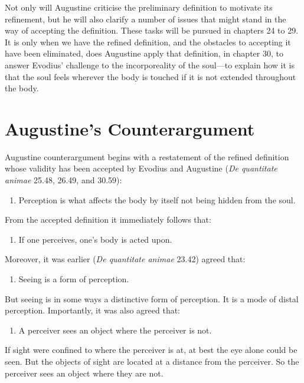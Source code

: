 \documentclass[12pt]{article}
\begin{document}
Not only will Augustine criticise the preliminary definition to motivate its refinement, but he will also clarify a number of issues that might stand in the way of accepting the definition. These tasks will be pursued in chapters 24 to 29. It is only when we have the refined definition, and the obstacles to accepting it have been eliminated, does Augustine apply that definition, in chapter 30, to answer Evodius' challenge to the incorporeality of the soul---to explain how it is that the soul feels wherever the body is touched if it is not extended throughout the body.



\section{Augustine's Counterargument} %
\label{sec:augustine_s_counterargument}

Augustine counterargument begins with a restatement of the refined definition whose validity has been accepted by Evodius and Augustine (\emph{De quantitate animae} 25.48, 26.49, and 30.59):
\begin{enumerate}[1.]
	\item Perception is what affects the body by itself not being hidden from the soul.
\end{enumerate}
From the accepted definition it immediately follows that:
\begin{enumerate}[2.]
	\item If one perceives, one's body is acted upon.
\end{enumerate}
Moreover, it was earlier (\emph{De quantitate animae} 23.42) agreed that:
\begin{enumerate}[3.]
	\item Seeing is a form of perception.
\end{enumerate}
But seeing is in some ways a distinctive form of perception. It is a mode of distal perception. Importantly, it was also agreed that:
\begin{enumerate}[4.]
	\item A perceiver sees an object where the perceiver is not.
\end{enumerate}
If sight were confined to where the perceiver is at, at best the eye alone could be seen. But the objects of sight are located at a distance from the perceiver. So the perceiver sees an object where they are not. 
\end{document}
